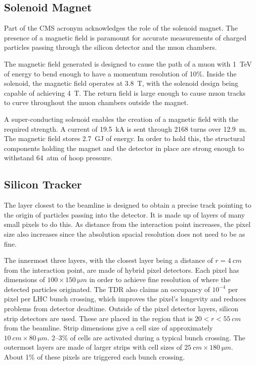 \subsection{Solenoid Magnet}

Part of the CMS acronym acknowledges the role of the solenoid magnet.
The presence of a magnetic field is paramount for accurate measurements
of charged particles passing through the silicon detector and the muon chambers.

The magnetic field generated is designed to cause the path of
a muon with \SI{1}{TeV} of energy to bend enough to have a momentum resolution of 10\%.
Inside the solenoid, the magnetic field operates at \SI{3.8}{T},
with the solenoid design being capable of achieving \SI{4}{T}.
The return field is large enough to cause muon tracks to curve throughout
the muon chambers outside the magnet.

A super-conducting solenoid enables the creation of a magnetic field
with the required strength.
A current of \SI{19.5}{kA} is sent through 2168 turns over \SI{12.9}{m}.
The magnetic field stores \SI{2.7}{GJ} of energy.
In order to hold this, the structural components holding the magnet and
the detector in place are strong enough to withstand \SI{64}{atm} of hoop pressure.

\subsection{Silicon Tracker}

The layer closest to the beamline is designed to obtain a precise track pointing
to the origin of particles passing into the detector.
It is made up of layers of many small pixels to do this.
As distance from the interaction point increases, the pixel size also increases
since the absolution spacial resolution does not need to be as fine.

The innermost three layers, with the closest layer being a distance of
$r=\SI{4}{cm}$ from the interaction point,
are made of hybrid pixel detectors.
Each pixel has dimensions of $100 \times \SI{150}{\micro m}$
in order to achieve fine resolution of where the detected particles originated.
The TDR also claims an occupancy of $10^{-4}$ per pixel per LHC bunch crossing,
which improves the pixel's longevity and reduces problems from detector deadtime.
Outside of the pixel detector layers,
silicon strip detectors are used.
These are placed in the region that is $20 < r < \SI{55}{cm}$ from the beamline.
Strip dimensions give a cell size of approximately $\SI{10}{cm} \times \SI{80}{\micro m}$.
2--3\% of cells are activated during a typical bunch crossing.
The outermost layers are made of larger strips with cell sizes of
$\SI{25}{cm} \times \SI{180}{\micro m}$.
About 1\% of these pixels are triggered each bunch crossing.

